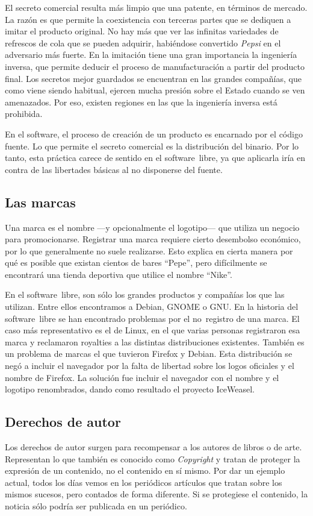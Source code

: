 El secreto comercial resulta más limpio que una patente, en términos
de mercado. La razón es que permite la coexistencia con terceras
partes que se dediquen a imitar el producto original. No hay más que
ver las infinitas variedades de refrescos de cola que se pueden
adquirir, habiéndose convertido \emph{Pepsi} en el adversario más
fuerte. En la imitación tiene una gran importancia la ingeniería
inversa, que permite deducir el proceso de manufacturación a partir
del producto final. Los secretos mejor guardados se encuentran en las
grandes compañías, que como viene siendo habitual, ejercen mucha
presión sobre el Estado cuando se ven amenazados. Por eso, existen
regiones en las que la ingeniería inversa está prohibida.

En el software, el proceso de creación de un producto es encarnado por
el código fuente. Lo que permite el secreto comercial es la
distribución del binario. Por lo tanto, esta práctica carece de
sentido en el software~libre, ya que aplicarla iría en contra de las
libertades básicas al no disponerse del fuente.

\subsection{Las marcas}
Una marca es el nombre ---y opcionalmente el logotipo--- que utiliza
un negocio para promocionarse. Registrar una marca requiere cierto
desembolso económico, por lo que generalmente no suele
realizarse. Esto explica en cierta manera por qué es posible que
existan cientos de bares ``Pepe'', pero difícilmente se encontrará una
tienda deportiva que utilice el nombre ``Nike''.

En el software~libre, son sólo los grandes productos y compañías los
que las utilizan. Entre ellos encontramos a Debian, GNOME o GNU. En la
historia del software~libre se han encontrado problemas por el
no~registro de una marca. El caso más representativo es el de Linux,
en el que varias personas registraron esa marca y reclamaron royalties
a las distintas distribuciones existentes. También es un problema de
marcas el que tuvieron Firefox y Debian. Esta distribución se negó a
incluir el navegador por la falta de libertad sobre los logos
oficiales y el nombre de Firefox. La solución fue incluir el navegador
con el nombre y el logotipo renombrados, dando como resultado el
proyecto IceWeasel.

\subsection{Derechos de autor}
Los derechos de autor surgen para recompensar a los autores de libros
o de arte. Representan lo que también es conocido como
\emph{Copyright} y tratan de proteger la expresión de un contenido, no
el contenido en sí mismo. Por dar un ejemplo actual, todos los días
vemos en los periódicos artículos que tratan sobre los mismos sucesos,
pero contados de forma diferente. Si se protegiese el contenido, la
noticia sólo podría ser publicada en un periódico.

